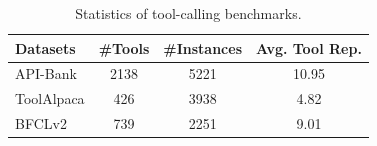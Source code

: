 \begin{table}[t]
\centering
\vspace{-0.5cm}
\small
\begin{tabular}{@{}lccc@{}}
\toprule
\bf Datasets & \bf \#Tools & \bf \#Instances & \bf Avg. Tool Rep. \\\midrule
API-Bank &2138  &5221 & 10.95 \\
ToolAlpaca &426 &3938 & 4.82 \\
BFCLv2 & 739 &2251  & 9.01 \\
\bottomrule
\end{tabular}%
\caption{Statistics of tool-calling benchmarks.}
\label{tab:tool_frequency}
\end{table}

